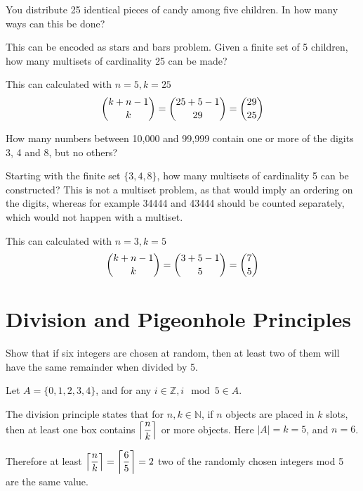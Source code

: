 \documentclass[openany, 11pt]{book}
\begin{document}
\begin{exercise}{}{}
	You distribute 25 identical pieces of candy among five children. In how many
	ways can this be done?
	\begin{alist}
		\item This can be encoded as stars and bars problem. Given a finite set of 5
		children, how many multisets of cardinality 25 can be made?
		\item This can calculated with $n=5, k=25$
		$$ \dbinom{k+n-1}{k} = \dbinom{25+5-1}{29}=\dbinom{29}{25}$$
	\end{alist}
\end{exercise}

\begin{exercise}{}{}
	How many numbers between 10,000 and 99,999 contain one or more of the digits
	3, 4 and 8, but no others?
	\begin{alist}
		\item Starting with the finite set $\{3, 4, 8\}$, how many multisets of
		cardinality 5 can be constructed? This is not a multiset problem, as that
		would imply an ordering on the digits, whereas for example 34444 and 43444
		should be counted separately, which would not happen with a multiset.
		\item This can calculated with $n=3, k=5$
		$$ \dbinom{k+n-1}{k} = \dbinom{3+5-1}{5}=\dbinom{7}{5}$$
	\end{alist}
\end{exercise}

\section{Division and Pigeonhole Principles}

\begin{exercise}{}{}
	Show that if six integers are chosen at random, then at
	least two of them will have the same remainder when divided by 5.
	\begin{alist}
		\item Let $A=\{0, 1, 2, 3, 4\}$, and for any $i\in\mathbb{Z}, i\mod 5 \in
			A$.
		\item The division principle states that for $n, k\in \mathbb{N}$, if $n$
		objects are placed in $k$ slots, then at least one box contains
		$\left\lceil\dfrac{n}{k}\right\rceil$ or more objects. Here $|A|=k=5$, and $n=6$.
		\item Therefore at least $\left\lceil\dfrac{n}{k}\right\rceil=\left\lceil\dfrac{6}{5}\right\rceil=2$
		two of the randomly chosen integers mod 5 are the same value.
	\end{alist}
\end{exercise}
\end{document}
